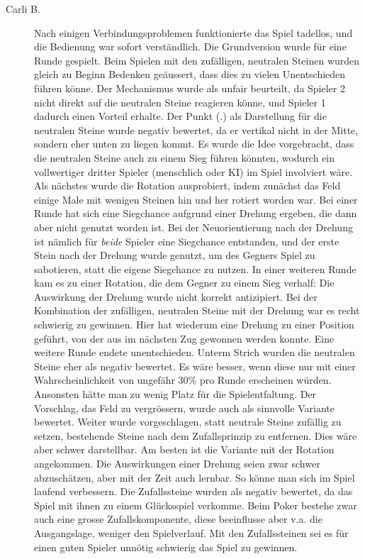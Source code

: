 \documentclass[a4paper,11pt,hidelinks]{scrartcl}
\begin{document}
\begin{description}
    \item[Carli B.] Nach einigen Verbindungsproblemen funktionierte das Spiel tadellos, und die Bedienung war sofort verständlich. Die Grundversion wurde für eine Runde gespielt. Beim Spielen mit den zufälligen, neutralen Steinen wurden gleich zu Beginn Bedenken geäussert, dass dies zu vielen Unentschieden führen könne. Der Mechanismus wurde als unfair beurteilt, da Spieler 2 nicht direkt auf die neutralen Steine reagieren könne, und Spieler 1 dadurch einen Vorteil erhalte. Der Punkt (.) als Darstellung für die neutralen Steine wurde negativ bewertet, da er vertikal nicht in der Mitte, sondern eher unten zu liegen kommt. Es wurde die Idee vorgebracht, dass die neutralen Steine auch zu einem Sieg führen könnten, wodurch ein vollwertiger dritter Spieler (menschlich oder KI) im Spiel involviert wäre. Als nächstes wurde die Rotation ausprobiert, indem zunächst das Feld einige Male mit wenigen Steinen hin und her rotiert worden war. Bei einer Runde hat sich eine Siegchance aufgrund einer Drehung ergeben, die dann aber nicht genutzt worden ist. Bei der Neuorientierung nach der Drehung ist nämlich für \textit{beide} Spieler eine Siegchance entstanden, und der erste Stein nach der Drehung wurde genutzt, um des Gegners Spiel zu sabotieren, statt die eigene Siegchance zu nutzen. In einer weiteren Runde kam es zu einer Rotation, die dem Gegner zu einem Sieg verhalf: Die Auswirkung der Drehung wurde nicht korrekt antizipiert. Bei der Kombination der zufälligen, neutralen Steine mit der Drehung war es recht schwierig zu gewinnen. Hier hat wiederum eine Drehung zu einer Position geführt, von der aus im nächsten Zug gewonnen werden konnte. Eine weitere Runde endete unentschieden. Unterm Strich wurden die neutralen Steine eher als negativ bewertet. Es wäre besser, wenn diese nur mit einer Wahrscheinlichkeit von ungefähr 30\% pro Runde erscheinen würden. Ansonsten hätte man zu wenig Platz für die Spielentfaltung. Der Vorschlag, das Feld zu vergrössern, wurde auch als sinnvolle Variante bewertet. Weiter wurde vorgeschlagen, statt neutrale Steine zufällig zu setzen, bestehende Steine nach dem Zufallsprinzip zu entfernen. Dies wäre aber schwer darstellbar. Am besten ist die Variante mit der Rotation angekommen. Die Auswirkungen einer Drehung seien zwar schwer abzuschätzen, aber mit der Zeit auch lernbar. So könne man sich im Spiel laufend verbessern. Die Zufallssteine wurden als negativ bewertet, da das Spiel mit ihnen zu einem Glücksspiel verkomme. Beim Poker bestehe zwar auch eine grosse Zufallskomponente, diese beeinflusse aber v.a. die Ausgangslage, weniger den Spielverlauf. Mit den Zufallssteinen sei es für einen guten Spieler unnötig schwierig das Spiel zu gewinnen.
\end{description}
\end{document}

